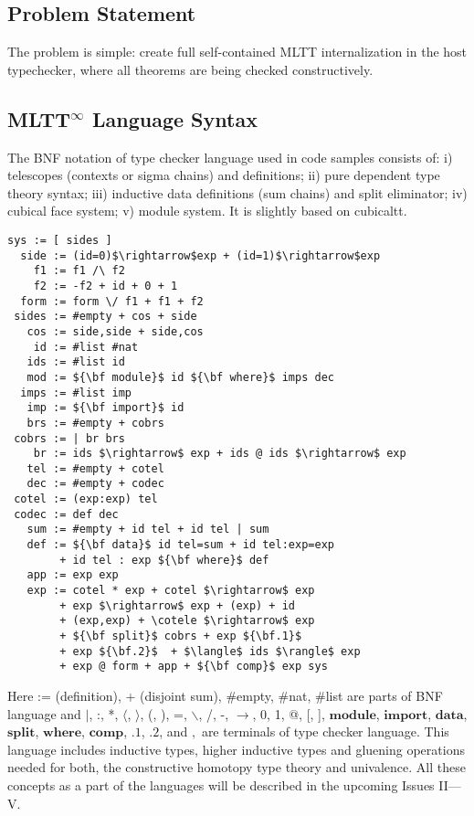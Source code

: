 \documentclass[twocolumn,10pt]{article}
\theoremstyle{definition}
\begin{document}
\subsection*{Problem Statement}

The problem is simple: create full self-contained MLTT internalization in the host typechecker,
where all theorems are being checked constructively.

\subsection*{MLTT$^\infty$ Language Syntax}

The BNF notation of type checker language used in code samples consists of:
i) telescopes (contexts or sigma chains) and definitions;
ii) pure dependent type theory syntax;
iii) inductive data definitions (sum chains) and split eliminator;
iv) cubical face system;
v) module system. It is slightly based on cubicaltt.

\begin{lstlisting}[mathescape=true]
   sys := [ sides ]
  side := (id=0)$\rightarrow$exp + (id=1)$\rightarrow$exp
    f1 := f1 /\ f2
    f2 := -f2 + id + 0 + 1
  form := form \/ f1 + f1 + f2
 sides := #empty + cos + side
   cos := side,side + side,cos
    id := #list #nat
   ids := #list id
   mod := ${\bf module}$ id ${\bf where}$ imps dec
  imps := #list imp
   imp := ${\bf import}$ id
   brs := #empty + cobrs
 cobrs := | br brs
    br := ids $\rightarrow$ exp + ids @ ids $\rightarrow$ exp
   tel := #empty + cotel
   dec := #empty + codec
 cotel := (exp:exp) tel
 codec := def dec
   sum := #empty + id tel + id tel | sum
   def := ${\bf data}$ id tel=sum + id tel:exp=exp
        + id tel : exp ${\bf where}$ def
   app := exp exp
   exp := cotel * exp + cotel $\rightarrow$ exp
        + exp $\rightarrow$ exp + (exp) + id
        + (exp,exp) + \cotele $\rightarrow$ exp
        + ${\bf split}$ cobrs + exp ${\bf.1}$
        + exp ${\bf.2}$  + $\langle$ ids $\rangle$ exp
        + exp @ form + app + ${\bf comp}$ exp sys
\end{lstlisting}

Here := (definition), + (disjoint sum), \#empty, \#nat, \#list are parts of BNF language and
$\rvert$, :, *, $\langle$, $\rangle$, (, ), =, $\backslash$, /, -, $\rightarrow$, 0, 1, @, [, ],
$\mathbf{module}$, $\mathbf{import}$,
$\mathbf{data}$, $\mathbf{split}$, $\mathbf{where}$, $\mathbf{comp}$, $\mathbf{.1}$, $\mathbf{.2}$,
 and $,$ are terminals of type checker language. This language includes
inductive types, higher inductive types and gluening operations needed for
both, the constructive homotopy type theory and univalence. All these concepts as a part of the languages
will be described in the upcoming Issues II---V.
\end{document}
